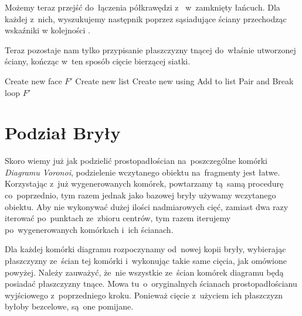\documentclass[skorowidz,autorrok,backref,xodstep,oswiadczenie]{wmimgr}
\begin{document}
Możemy teraz przejść do~łączenia półkrawędzi z~ w~zamknięty łańcuch. Dla każdej z~nich, wyszukujemy następnik poprzez sąsiadujące ściany przechodząc wskaźniki w kolejności .

Teraz pozostaje nam tylko przypisanie płaszczyzny tnącej do~właśnie utworzonej ściany, kończąc w~ten sposób cięcie bierzącej siatki.

\begin{algorithm}
\caption{$BuildCutFace(V, P)$}
\label{BuildCutFace}
\begin{algorithmic}
    \STATE Create new face $F'$
    \STATE Create new list 
        \STATE Create new  using 
        \STATE Add  to list 
                \STATE Pair  and 
                \STATE Break loop
            \ENDIF
        \ENDFOR
    \ENDFOR
        \STATE {}
    \ENDFOR
    \STATE {}
    \RETURN $F'$
\end{algorithmic}
\end{algorithm}

\section{Podział Bryły}

Skoro wiemy już jak podzielić prostopadłościan na~poszczególne komórki \emph{Diagramu Voronoi}, podzielenie wczytanego obiektu na~fragmenty jest łatwe. Korzystając z~już wygenerowanych komórek, powtarzamy tą~samą procedurę co~poprzednio, tym razem jednak jako bazowej bryły używamy wczytanego obiektu. Aby nie wykonywać dużej ilości nadmiarowych cięć, zamiast dwa razy iterować po~punktach ze~zbioru centrów, tym razem iterujemy po~wygenerowanych komórkach i~ich ścianach.

Dla każdej komórki diagramu rozpoczynamy od~nowej kopii bryły, wybierając płaszczyzny ze~ścian tej komórki i~wykonując takie same cięcia, jak omówione powyżej. Należy zauważyć, że~nie wszystkie ze~ścian komórek diagramu będą posiadać płaszczyzny tnące. Mowa tu~o~oryginalnych ścianach prostopadłościanu wyjściowego z~poprzedniego kroku. Ponieważ cięcie z~użyciem ich płaszczyzn byłoby bezcelowe, są~one pomijane.
\end{document}
